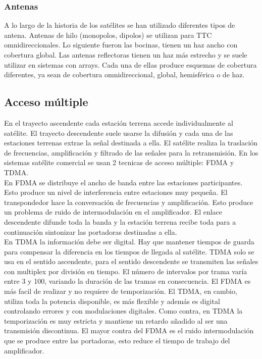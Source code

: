 		\subsubsection{Antenas}
		\label{ssub:antenas}
		A lo largo de la historia de los satélites se han utilizado diferentes tipos de antena. Antenas de hilo (monopolos, dipolos) se utilizan para TTC omnidireccionales. Lo siguiente fueron las bocinas, tienen un haz ancho con cobertura global. Las antenas reflectoras tienen un haz más estrecho y se suele utilizar en sistemas con arrays. Cada una de ellas produce esquemas de cobertura diferentes, ya sean de cobertura omnidireccional, global, hemisférica o de haz.
	\subsection{Acceso múltiple}
	\label{sub:satAccesoMultiple}
		En el trayecto ascendente cada estación terrena accede individualmente al satélite. El trayecto descendente suele usarse la difusión y cada una de las estaciones terrenas extrae la señal destinada a ella. El satélite realiza la traslación de frecuencias, amplificación y filtrado de las señales para la retransmisión. En los sistemas satélite comercial se usan 2 tecnicas de acceso múltiple: \acrshort{FDMA} y \acrshort{TDMA}.\\
		En \acrshort{FDMA} se distribuye el ancho de banda entre las estaciones participantes. Esto produce un nivel de interferencia entre estaciones muy pequeña. El transpondedor hace la conversación de frecuencias y amplificación. Esto produce un problema de ruido de intermodulación en el amplificador. El enlace descendente difunde toda la banda y la estación terrena recibe toda para a continuación sintonizar las portadoras destinadas a ella.\\
		En \acrshort{TDMA} la información debe ser digital. Hay que mantener tiempos de guarda para compensar la diferencia en los tiempos de llegada al satélite. \acrshort{TDMA} solo se usa en el sentido ascendente, para el sentido descendente se transmiten las señales con multiplex por división en tiempo. El número de intervalos por trama varía entre 3 y 100, variando la duración de las tramas en consecuencia.
		El \acrshort{FDMA} es más facil de realizar y no requiere de temporización. El \acrshort{TDMA}, en cambio, utiliza toda la potencia disponible, es más flexible y además es digital controlando errores y con modulaciones digitales. Como contra, en \acrshort{TDMA} la temporización es muy estricta y mantiene un retardo añadido al ser una transmisión discontinua. El mayor contra del \acrshort{FDMA} es el ruido intermodulación que se produce entre las portadoras, esto reduce el tiempo de trabajo del amplificador.
